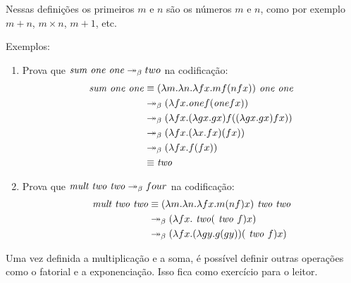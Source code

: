 \documentclass[../main.tex]{subfiles}
\begin{document}
Nessas definições os primeiros $m$ e $n$ são os números $m$ e $n$, como por exemplo $m + n$, $m \times n$, $m + 1$, etc.

Exemplos:

\begin{enumerate}
    \item Prova que $\text{\emph{sum one one}} \twoheadrightarrow_{\beta} two$ na codificação:
    \begin{equation*}
        \begin{split}
            \text{\emph{sum one one}} & \equiv (\lambda m . \lambda n . \lambda fx . m f(nfx)) \text{\emph{ one one}}
                                   \\ & \twoheadrightarrow_{\beta} ( \lambda fx . \text{\emph{one}} f(\text{\emph{one}}fx))
                                   \\ & \twoheadrightarrow_{\beta} ( \lambda fx . (\lambda gx . gx) f((\lambda gx . gx)fx))
                                   \\ & \twoheadrightarrow_{\beta} ( \lambda fx . (\lambda x . fx) (fx))
                                   \\ & \twoheadrightarrow_{\beta} ( \lambda fx . f(fx))
                                   \\ & \equiv \text{\emph{two}}
        \end{split}
    \end{equation*}
    \item Prova que $\text{\emph{mult two two}} \twoheadrightarrow_{\beta} four$ na codificação:
    \begin{equation*}
        \begin{split}
            \text{\emph{mult two two}} & \equiv (\lambda m . \lambda n . \lambda fx . m (nf) x) \text{\emph{ two two}}
                                   \\ & \twoheadrightarrow_{\beta} (\lambda fx . \text{\emph{ two}} (\text{\emph{ two }}f) x)
                                   \\ & \twoheadrightarrow_{\beta} (\lambda fx . (\lambda gy . g(gy) )(\text{\emph{ two }}f) x)
        \end{split}
    \end{equation*}
\end{enumerate}

Uma vez definida a multiplicação e a soma, é possível definir outras operações como o fatorial e a exponenciação. Isso fica como exercício para o leitor.
\end{document}
